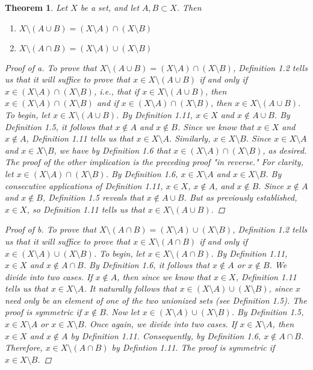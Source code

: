 \documentclass[titlepage]{article}
\newcounter{script}
\newtheorem{theorem}{Theorem}[script]
\begin{document}
\begin{theorem}
    Let $X$ be a set, and let $A,B\subset X$. Then
    \begin{enumerate}[label={\alph*\textup{)}}]
        \item $X\setminus(A\cup B)=(X\setminus A)\cap(X\setminus B)$
        \item $X\setminus(A\cap B)=(X\setminus A)\cup(X\setminus B)$
    \end{enumerate}
    \begin{proof}[Proof of a]
        To prove that $X\setminus(A\cup B)=(X\setminus A)\cap(X\setminus B)$, Definition 1.2 tells us that it will suffice to prove that $x\in X\setminus(A\cup B)$ if and only if $x\in (X\setminus A)\cap(X\setminus B)$, i.e., that if $x\in X\setminus(A\cup B)$, then $x\in (X\setminus A)\cap(X\setminus B)$ and if $x\in (X\setminus A)\cap(X\setminus B)$, then $x\in X\setminus(A\cup B)$. To begin, let $x\in X\setminus(A\cup B)$. By Definition 1.11, $x\in X$ and $x\notin A\cup B$. By Definition 1.5, it follows that $x\notin A$ and $x\notin B$. Since we know that $x\in X$ and $x\notin A$, Definition 1.11 tells us that $x\in X\setminus A$. Similarly, $x\in X\setminus B$. Since $x\in X\setminus A$ and $x\in X\setminus B$, we have by Definition 1.6 that $x\in(X\setminus A)\cap(X\setminus B)$, as desired. The proof of the other implication is the preceding proof "in reverse." For clarity, let $x\in(X\setminus A)\cap(X\setminus B)$. By Definition 1.6, $x\in X\setminus A$ and $x\in X\setminus B$. By consecutive applications of Definition 1.11, $x\in X$, $x\notin A$, and $x\notin B$. Since $x\notin A$ and $x\notin B$, Definition 1.5 reveals that $x\notin A\cup B$. But as previously established, $x\in X$, so Definition 1.11 tells us that $x\in X\setminus(A\cup B)$.
    \end{proof}
    \begin{proof}[Proof of b]
        To prove that $X\setminus(A\cap B)=(X\setminus A)\cup(X\setminus B)$, Definition 1.2 tells us that it will suffice to prove that $x\in X\setminus(A\cap B)$ if and only if $x\in (X\setminus A)\cup(X\setminus B)$. To begin, let $x\in X\setminus(A\cap B)$. By Definition 1.11, $x\in X$ and $x\notin A\cap B$. By Definition 1.6, it follows that $x\notin A$ or $x\notin B$. We divide into two cases. If $x\notin A$, then since we know that $x\in X$, Definition 1.11 tells us that $x\in X\setminus A$. It naturally follows that $x\in(X\setminus A)\cup(X\setminus B)$, since $x$ need only be an element of one of the two unionized sets (see Definition 1.5). The proof is symmetric if $x\notin B$. Now let $x\in(X\setminus A)\cup(X\setminus B)$. By Definition 1.5, $x\in X\setminus A$ or $x\in X\setminus B$. Once again, we divide into two cases. If $x\in X\setminus A$, then $x\in X$ and $x\notin A$ by Definition 1.11. Consequently, by Definition 1.6, $x\notin A\cap B$. Therefore, $x\in X\setminus(A\cap B)$ by Defintion 1.11. The proof is symmetric if $x\in X\setminus B$.
    \end{proof}
\end{theorem}
\end{document}
